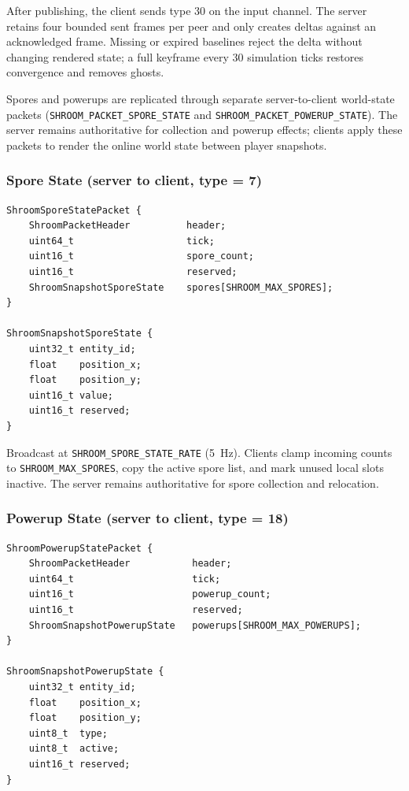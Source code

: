 \documentclass[11pt]{article}
\begin{document}
After publishing, the client sends type 30 on the input channel. The server retains four bounded sent frames per peer and only creates deltas against an acknowledged frame. Missing or expired baselines reject the delta without changing rendered state; a full keyframe every 30 simulation ticks restores convergence and removes ghosts.

Spores and powerups are replicated through separate server-to-client world-state packets (\texttt{SHROOM\_PACKET\_SPORE\_STATE} and \texttt{SHROOM\_PACKET\_POWERUP\_STATE}). The server remains authoritative for collection and powerup effects; clients apply these packets to render the online world state between player snapshots.

\subsubsection{Spore State (server to client, type = 7)}

\begin{verbatim}
ShroomSporeStatePacket {
    ShroomPacketHeader          header;
    uint64_t                    tick;
    uint16_t                    spore_count;
    uint16_t                    reserved;
    ShroomSnapshotSporeState    spores[SHROOM_MAX_SPORES];
}

ShroomSnapshotSporeState {
    uint32_t entity_id;
    float    position_x;
    float    position_y;
    uint16_t value;
    uint16_t reserved;
}
\end{verbatim}

Broadcast at \texttt{SHROOM\_SPORE\_STATE\_RATE} (5~Hz). Clients clamp incoming counts to \texttt{SHROOM\_MAX\_SPORES}, copy the active spore list, and mark unused local slots inactive. The server remains authoritative for spore collection and relocation.

\subsubsection{Powerup State (server to client, type = 18)}

\begin{verbatim}
ShroomPowerupStatePacket {
    ShroomPacketHeader           header;
    uint64_t                     tick;
    uint16_t                     powerup_count;
    uint16_t                     reserved;
    ShroomSnapshotPowerupState   powerups[SHROOM_MAX_POWERUPS];
}

ShroomSnapshotPowerupState {
    uint32_t entity_id;
    float    position_x;
    float    position_y;
    uint8_t  type;
    uint8_t  active;
    uint16_t reserved;
}
\end{verbatim}
\end{document}
